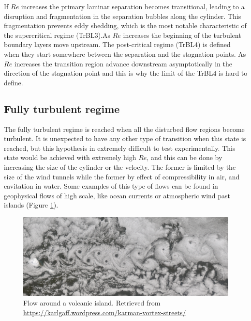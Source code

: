 \documentclass[journal]{new-aiaa}
\begin{document}
If $Re$ increases the primary laminar separation becomes transitional, leading to a disruption and fragmentation in the separation bubbles along the cylinder. This fragmentation prevents eddy shedding, which is the most notable characteristic of the supercritical regime (TrBL3).As $Re$ increases the beginning of the turbulent boundary layers move upstream. The post-critical regime (TrBL4) is defined when they start somewhere between the separation and the stagnation points. As $Re$ increases the transition region advance downstream asymptotically in the direction of the stagnation point and this is why the limit of the TrBL4 is hard to define.   




\subsection{Fully turbulent regime}

The fully turbulent regime is reached when all the disturbed flow regions become turbulent. It is unexpected to have any other type of transition when this state is reached, but this hypothesis in extremely difficult to test experimentally. This state would be achieved with extremely high $Re$, and this can be done by increasing the size of the cylinder or the velocity. The former is limited by the size of the wind tunnels while the former by effect of compressibility in air, and cavitation in water. Some examples of this type of flows can be found in geophysical flows of high scale, like ocean currents or atmospheric wind past islands (Figure \ref{fig:T}).

\begin{figure}[H]
\begin{center}
\includegraphics[width=1\textwidth]{Images/federico/Figure07}
\caption{Flow around a volcanic island. Retrieved from  \url{https://karlgaff.wordpress.com/karman-vortex-streets/}}
\label{fig:T}
\end{center}
\end{figure}
\end{document}
